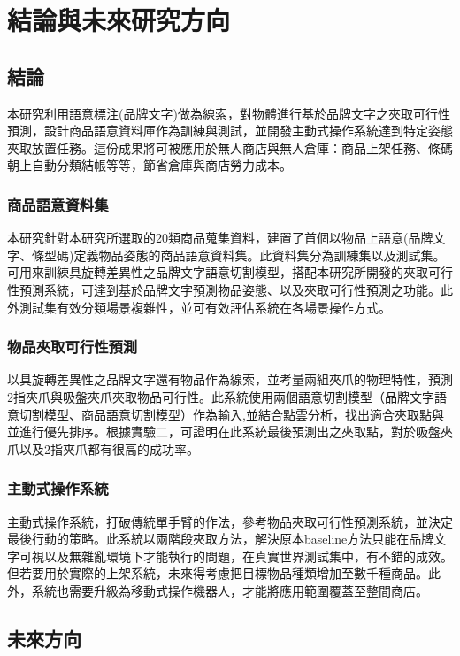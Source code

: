 \chapter{結論與未來研究方向}
\label{chapter:conclusions}

\section{結論}
本研究利用語意標注(品牌文字)做為線索，對物體進行基於品牌文字之夾取可行性預測，設計商品語意資料庫作為訓練與測試，並開發主動式操作系統達到特定姿態夾取放置任務。這份成果將可被應用於無人商店與無人倉庫：商品上架任務、條碼朝上自動分類結帳等等，節省倉庫與商店勞力成本。

\subsection{商品語意資料集}
本研究針對本研究所選取的20類商品蒐集資料，建置了首個以物品上語意(品牌文字、條型碼)定義物品姿態的商品語意資料集。此資料集分為訓練集以及測試集。可用來訓練具旋轉差異性之品牌文字語意切割模型，搭配本研究所開發的夾取可行性預測系統，可達到基於品牌文字預測物品姿態、以及夾取可行性預測之功能。此外測試集有效分類場景複雜性，並可有效評估系統在各場景操作方式。

\subsection{物品夾取可行性預測}
以具旋轉差異性之品牌文字還有物品作為線索，並考量兩組夾爪的物理特性，預測2指夾爪與吸盤夾爪夾取物品可行性。此系統使用兩個語意切割模型（品牌文字語意切割模型、商品語意切割模型）作為輸入,並結合點雲分析，找出適合夾取點與並進行優先排序。根據實驗二，可證明在此系統最後預測出之夾取點，對於吸盤夾爪以及2指夾爪都有很高的成功率。

\subsection{主動式操作系統}
主動式操作系統，打破傳統單手臂的作法，參考物品夾取可行性預測系統，並決定最後行動的策略。此系統以兩階段夾取方法，解決原本baseline方法只能在品牌文字可視以及無雜亂環境下才能執行的問題，在真實世界測試集中，有不錯的成效。但若要用於實際的上架系統，未來得考慮把目標物品種類增加至數千種商品。此外，系統也需要升級為移動式操作機器人，才能將應用範圍覆蓋至整間商店。

\section{未來方向}

